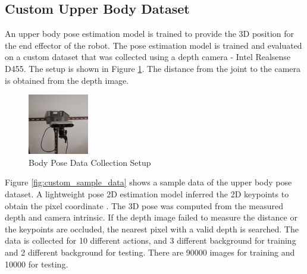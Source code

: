 \newpage
\subsection{Custom Upper Body Dataset}
\noindent
An upper body pose estimation model is trained to provide the 3D position for the end effector of the robot. The pose estimation model is trained and evaluated on a custom dataset that was collected using a depth camera - Intel Realsense D455. The setup is shown in Figure \ref{fig:body_pose_data_collection_setup}. The distance from the joint to the camera is obtained from the depth image.

\begin{figure}[ht]
	\begin{center}
		\includegraphics[width=100px]{assets/body_pose_setup.jpg}
		\caption{Body Pose Data Collection Setup}
		\label{fig:body_pose_data_collection_setup}
	\end{center}
\end{figure}

\noindent
Figure \ref{fig:custom_sample_data} shows a sample data of the upper body pose dataset. A lightweight pose 2D estimation model inferred the 2D keypoints to obtain the pixel coordinate \cite{lightweightopenpose}. The 3D pose was computed from the measured depth and camera intrinsic. If the depth image failed to measure the distance or the keypoints are occluded, the nearest pixel with a valid depth is searched. The data is collected for 10 different actions, and 3 different background for training and 2 different background for testing. There are 90000 images for training and 10000 for testing.

